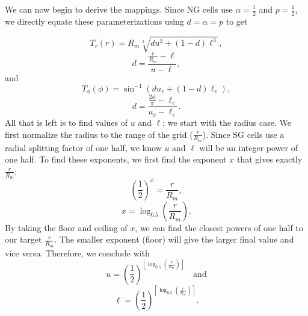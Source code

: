We can now begin to derive the mappings. Since NG cells use $\alpha = \frac{1}{2}$ and $p = \frac{1}{2}$, we directly equate these parameterizations using $d = \alpha = p$ to get

\begin{equation*}
T_{r}(r) = R_{m} \sqrt[3]{ d u^{3} + \left( 1 - d \right) \ell^{3} },
\end{equation*}
%
\begin{equation*}
d = \frac{\frac{r}{R_{m}} - \ell}{u - \ell},
\end{equation*}
%
and
%
\begin{equation*}
T_{\phi}(\phi) = \sin^{-1} \left( d u_{v} + \left( 1 - d \right) \ell_{v} \right), 
\end{equation*}
%
\begin{equation*}
d = \frac{\frac{2\phi}{\pi} - \ell_{c}}{u_{c} - \ell_{c}}.
\end{equation*}
%
All that is left is to find values of $u$ and $\ell$; we start with the radius case. We first normalize the radius to the range of the grid ($\frac{r}{R_{m}}$). Since SG cells use a radial splitting factor of one half, we know $u$ and $\ell$ will be an integer power of one half. To find these exponents, we first find the exponent $x$ that gives exactly $\frac{r}{R_{m}}$:
%
\begin{equation*}
\left( \frac{1}{2} \right)^{x} = \frac{r}{R_{m}}, 
\end{equation*}
%
\begin{equation*}
x = \log_{0.5} \left( \frac{r}{R_{m}} \right).
\end{equation*}
%
By taking the floor and ceiling of $x$, we can find the closest powers of one half to our target $\frac{r}{R_{m}}$. The smaller exponent (floor) will give the larger final value and vice versa. Therefore, we conclude with
%
\begin{equation*}
u = \left( \frac{1}{2} \right)^{ \left\lfloor \log_{0.5} \left( \frac{r}{R_{m}} \right) \right\rfloor} \quad \text{and}
\end{equation*}
%
\begin{equation*}
\ell = \left( \frac{1}{2} \right)^{ \left\lceil \log_{0.5} \left( \frac{r}{R_{m}} \right) \right\rceil}.
\end{equation*}
%


